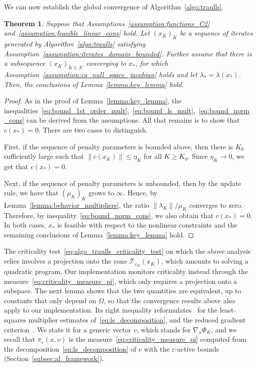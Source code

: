 \documentclass{article}
\numberwithin{equation}{section}
\newcommand{\calK}{{\mathcal{K}}}
\newcommand{\calT}{{\mathcal{T}}}
\theoremstyle{plain}
\newtheorem{theorem}{Theorem}
\begin{document}
	We can now establish the global convergence of Algorithm~\ref{algo:traulls}.
	\begin{theorem}\label{theo:global_convergence_traulls}
		Suppose that Assumptions~\ref{assumption:functions_C2} and~\ref{assumption:feasible_linear_cons} hold. Let $\left(x_K\right)_{K}$ be a sequence of iterates generated by Algorithm~\ref{algo:traulls} satisfying Assumption~\ref{assumption:iterates_domain_bounded}. Further assume that there is a subsequence $(x_K)_{K \in \calK}$ converging to $x_*$, for which Assumption~\ref{assumption:cq_null_space_jacobian} holds and let $\lambda_* = \lambda(x_*)$.
		Then, the conclusions of Lemma~\ref{lemma:key_lemma} hold.
	\end{theorem}
	\begin{proof}
		As in the proof of Lemma~\ref{lemma:key_lemma}, the inequalities~\eqref{eq:bound_1st_order_mult},~\eqref{eq:bound_ls_mult},~\eqref{eq:bound_norm_cons} can be derived from the assumptions. All that remains is to show that $c(x_*) = 0$. There are two cases to distinguish. 
	
		First, if the sequence of penalty parameters is bounded above, then there is $K_0$ sufficiently large such that $\|c(x_K)\| \le \eta_K$ for all $K \ge K_0$. Since $\eta_K \to 0$, we get that $c(x_*) = 0$.
	
	Next, if the sequence of penalty parameters is unbounded, then by the update rule, we have that $(\mu_K)_K$ grows to $\infty$. Hence, by Lemma~\ref{lemma:behavior_multipliers}, the ratio $\|\lambda_K\|/\mu_K$ converges to zero. Therefore, by inequality~\eqref{eq:bound_norm_cons}, we also obtain that $c(x_*) = 0$. 
	In both cases, $x_*$ is feasible with respect to the nonlinear constraints and the remaining conclusions of Lemma~\ref{lemma:key_lemma} hold.
\end{proof}
The criticality test~\eqref{eq:algo_traulls_criticality_test} on which the above analysis relies involves a projection onto the cone $\calT_{\varepsilon_K}(x_K)$, which amounts to solving a quadratic program. Our implementation monitors criticality instead through the measure~\eqref{eq:criticality_measure_pi}, which only requires a projection onto a subspace. The next lemma shows that the two quantities are equivalent, up to constants that only depend on $\Omega$, so that the convergence results above also apply to our implementation. Its right inequality reformulates~\cite[Lemma~7.1]{conn-etal:1996b} for the least-squares multiplier estimates of~\eqref{eq:ls_decomposition}, and the reduced gradient criterion~\cite[(7.3)]{conn-etal:1996b}. We state it for a generic vector $v$, which stands for $\nabla_x\Phi_K$, and we recall that $\pi_\varepsilon(x,v)$ is the measure~\eqref{eq:criticality_measure_pi} computed from the decomposition~\eqref{eq:ls_decomposition} of $v$ with the $\varepsilon$-active bounds (Section~\ref{subsec:al_framework}).
\end{document}
